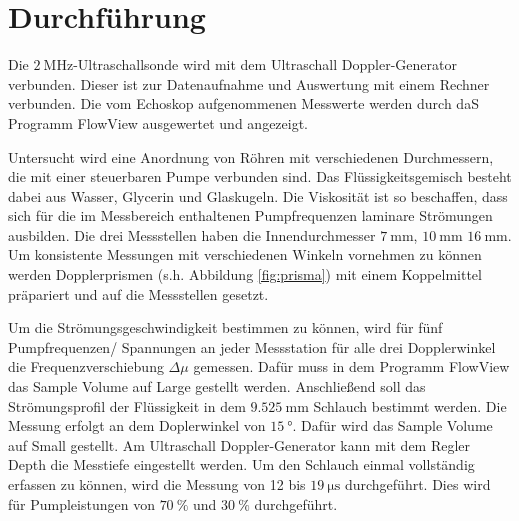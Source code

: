 \section{Durchführung}
\label{sec:Durchführung}

Die $\SI{2}{\mega\hertz}$-Ultraschallsonde wird mit dem Ultraschall Doppler-Generator verbunden.
Dieser ist zur Datenaufnahme und Auswertung mit einem Rechner verbunden.
Die vom Echoskop aufgenommenen Messwerte werden durch daS Programm FlowView ausgewertet und angezeigt.

Untersucht wird eine Anordnung von Röhren mit verschiedenen Durchmessern, die mit einer steuerbaren Pumpe verbunden sind.
Das Flüssigkeitsgemisch besteht dabei aus Wasser, Glycerin und Glaskugeln.
Die Viskosität ist so beschaffen, dass sich für die im Messbereich enthaltenen Pumpfrequenzen laminare Strömungen ausbilden.
Die drei Messstellen haben die Innendurchmesser $\SI{7}{\milli\metre}$, $\SI{10}{\milli\metre}$ $\SI{16}{\milli\metre}$.
Um konsistente Messungen mit verschiedenen Winkeln vornehmen zu können werden Dopplerprismen (s.h. Abbildung \ref{fig:prisma}) mit einem Koppelmittel präpariert und auf die Messstellen gesetzt.

Um die Strömungsgeschwindigkeit bestimmen zu können, wird für fünf Pumpfrequenzen/ Spannungen an jeder Messstation für alle drei Dopplerwinkel die Frequenzverschiebung $\Delta \mu$ gemessen.
Dafür muss in dem Programm FlowView das Sample Volume auf Large gestellt werden.
Anschließend soll das Strömungsprofil der Flüssigkeit in dem $\SI{9.525}{\milli\metre}$ Schlauch bestimmt werden.
Die Messung erfolgt an dem Doplerwinkel von $\SI{15}{\degree}$.
Dafür wird das Sample Volume auf Small gestellt.
Am Ultraschall Doppler-Generator kann mit dem Regler Depth die Messtiefe eingestellt werden.
Um den Schlauch einmal vollständig erfassen zu können, wird die Messung von 12 bis $\SI{19}{\micro\second}$ durchgeführt.
Dies wird für Pumpleistungen von $\SI{70}{\percent}$ und $\SI{30}{\percent}$ durchgeführt.
